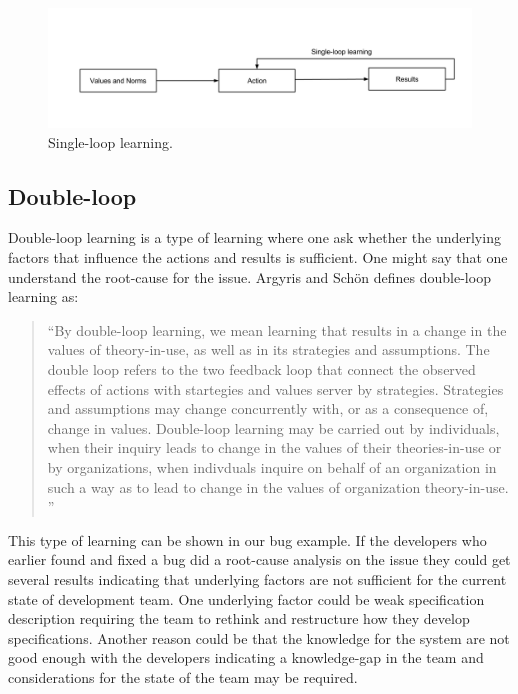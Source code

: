 \begin{figure}[!h]
	\centering
	\includegraphics[width=\textwidth, keepaspectratio]{figures/Single-loop.png}
	\caption{Single-loop learning.}
	\label{figure:single-loop}
\end{figure}

\subsection{Double-loop} %
\label{sub:double_loop}
Double-loop learning is a type of learning where one ask whether the underlying factors that influence the actions and results is sufficient.
One might say that one understand the root-cause for the issue. 
Argyris and Schön defines double-loop learning as: 

\begin{quote}
``By double-loop learning, we mean learning that results in a change in the values of theory-in-use, as well as in its strategies and assumptions. The double loop refers to the two feedback loop that connect the observed effects of actions with startegies and values server by strategies. Strategies and assumptions may change concurrently with, or as a consequence of, change in values. Double-loop learning may be carried out by individuals, when their inquiry leads to change in the values of their theories-in-use or by organizations, when indivduals inquire on behalf of an organization in such a way as to lead to change in the values of organization theory-in-use. ''
\end{quote}

This type of learning can be shown in our bug example. If the developers who earlier found and fixed a bug did a root-cause analysis on the issue they could get several results indicating that underlying factors are not sufficient for the current state of development team. One underlying factor could be weak specification description requiring the team to rethink and restructure how they develop specifications. Another reason could be that the knowledge for the system are not good enough with the developers indicating a knowledge-gap in the team and considerations for the state of the team may be required. 

